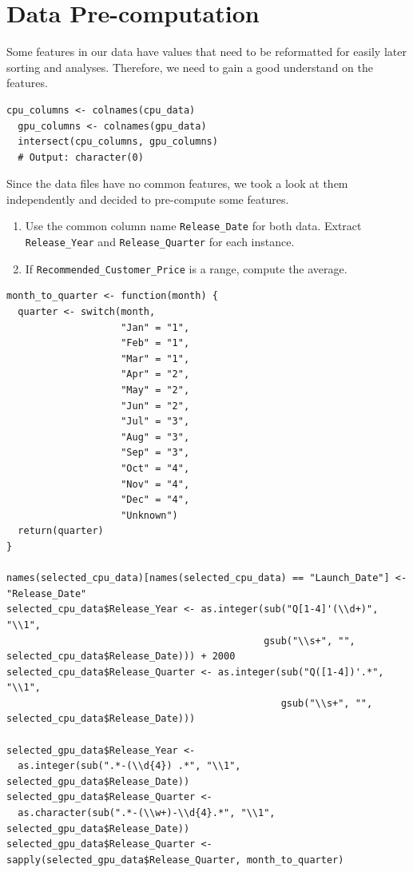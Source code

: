 \section{Data Pre-computation}

Some features in our data have values that need to be reformatted for easily later sorting and analyses. Therefore, we need to gain a good understand on the features.


\begin{lstlisting}[caption={A processing for selected features}]
  cpu_columns <- colnames(cpu_data)
  gpu_columns <- colnames(gpu_data)
  intersect(cpu_columns, gpu_columns)
  # Output: character(0)
\end{lstlisting}

Since the data files have no common features, we took a look at them independently and decided to pre-compute some features.

\begin{enumerate}
  \item Use the common column name \texttt{Release\_Date} for both data. Extract \texttt{Release\_Year} and \texttt{Release\_Quarter} for each instance.
  \item If \texttt{Recommended\_Customer\_Price} is a range, compute the average.
\end{enumerate}

\begin{lstlisting}[caption={Extract Year and Quarter from Dates}]
  month_to_quarter <- function(month) {
  quarter <- switch(month,
                    "Jan" = "1",
                    "Feb" = "1",
                    "Mar" = "1",
                    "Apr" = "2",
                    "May" = "2",
                    "Jun" = "2",
                    "Jul" = "3",
                    "Aug" = "3",
                    "Sep" = "3",
                    "Oct" = "4",
                    "Nov" = "4",
                    "Dec" = "4",
                    "Unknown")
  return(quarter)
}

names(selected_cpu_data)[names(selected_cpu_data) == "Launch_Date"] <- "Release_Date"
selected_cpu_data$Release_Year <- as.integer(sub("Q[1-4]'(\\d+)", "\\1", 
                                             gsub("\\s+", "", selected_cpu_data$Release_Date))) + 2000
selected_cpu_data$Release_Quarter <- as.integer(sub("Q([1-4])'.*", "\\1", 
                                                gsub("\\s+", "", selected_cpu_data$Release_Date)))

selected_gpu_data$Release_Year <- 
  as.integer(sub(".*-(\\d{4}) .*", "\\1", selected_gpu_data$Release_Date))
selected_gpu_data$Release_Quarter <- 
  as.character(sub(".*-(\\w+)-\\d{4}.*", "\\1", selected_gpu_data$Release_Date))
selected_gpu_data$Release_Quarter <- sapply(selected_gpu_data$Release_Quarter, month_to_quarter)
\end{lstlisting}